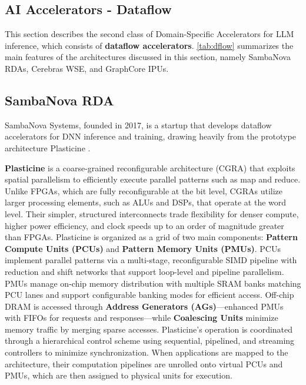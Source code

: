 \subsection{AI Accelerators - Dataflow}\label{chap:background:sec:dflow}

This section describes the second class of Domain-Specific Accelerators for LLM inference, which consists of \textbf{dataflow accelerators}. \ref{tab:dflow} summarizes the main features of the architectures discussed in this section, namely SambaNova RDAs, Cerebras WSE, and GraphCore IPUs.

\subsection{SambaNova RDA}

SambaNova Systems, founded in 2017, is a startup that develops dataflow accelerators for DNN inference and training, drawing heavily from the prototype architecture Plasticine \cite{Prabhakar2017}.

\textbf{Plasticine} is a coarse-grained reconfigurable architecture (CGRA) that exploits spatial parallelism to efficiently execute parallel patterns such as map and reduce. Unlike FPGAs, which are fully reconfigurable at the bit level, CGRAs utilize larger processing elements, such as ALUs and DSPs, that operate at the word level. Their simpler, structured interconnects trade flexibility for denser compute, higher power efficiency, and clock speeds up to an order of magnitude greater than FPGAs. Plasticine is organized as a grid of two main components: \textbf{Pattern Compute Units (PCUs)} and \textbf{Pattern Memory Units (PMUs)}. PCUs implement parallel patterns via a multi-stage, reconfigurable SIMD pipeline with reduction and shift networks that support loop-level and pipeline parallelism. PMUs manage on-chip memory distribution with multiple SRAM banks matching PCU lanes and support configurable banking modes for efficient access. Off-chip DRAM is accessed through \textbf{Address Generators (AGs)}—enhanced PMUs with FIFOs for requests and responses—while \textbf{Coalescing Units} minimize memory traffic by merging sparse accesses. Plasticine’s operation is coordinated through a hierarchical control scheme using sequential, pipelined, and streaming controllers to minimize synchronization. When applications are mapped to the architecture, their computation pipelines are unrolled onto virtual PCUs and PMUs, which are then assigned to physical units for execution.

